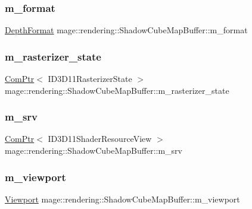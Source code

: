 \subsubsection{\texorpdfstring{m\+\_\+format}{m\_format}}
{\footnotesize\ttfamily \hyperlink{namespacemage_1_1rendering_ad477e1afff480649a92fb2253c65bfb0}{Depth\+Format} mage\+::rendering\+::\+Shadow\+Cube\+Map\+Buffer\+::m\+\_\+format\hspace{0.3cm}{\ttfamily [private]}}

\hypertarget{classmage_1_1rendering_1_1_shadow_cube_map_buffer_ab11e333f6832b5ec5710767badca29ef}{}\label{classmage_1_1rendering_1_1_shadow_cube_map_buffer_ab11e333f6832b5ec5710767badca29ef} 
\subsubsection{\texorpdfstring{m\+\_\+rasterizer\+\_\+state}{m\_rasterizer\_state}}
{\footnotesize\ttfamily \hyperlink{namespacemage_ae74f374780900893caa5555d1031fd79}{Com\+Ptr}$<$ I\+D3\+D11\+Rasterizer\+State $>$ mage\+::rendering\+::\+Shadow\+Cube\+Map\+Buffer\+::m\+\_\+rasterizer\+\_\+state\hspace{0.3cm}{\ttfamily [private]}}

\hypertarget{classmage_1_1rendering_1_1_shadow_cube_map_buffer_affc35790722dfa58640cc8a1962d9ec9}{}\label{classmage_1_1rendering_1_1_shadow_cube_map_buffer_affc35790722dfa58640cc8a1962d9ec9} 
\subsubsection{\texorpdfstring{m\+\_\+srv}{m\_srv}}
{\footnotesize\ttfamily \hyperlink{namespacemage_ae74f374780900893caa5555d1031fd79}{Com\+Ptr}$<$ I\+D3\+D11\+Shader\+Resource\+View $>$ mage\+::rendering\+::\+Shadow\+Cube\+Map\+Buffer\+::m\+\_\+srv\hspace{0.3cm}{\ttfamily [private]}}

\hypertarget{classmage_1_1rendering_1_1_shadow_cube_map_buffer_a43b1240a39ab1385832c20da6241c9cb}{}\label{classmage_1_1rendering_1_1_shadow_cube_map_buffer_a43b1240a39ab1385832c20da6241c9cb} 
\subsubsection{\texorpdfstring{m\+\_\+viewport}{m\_viewport}}
{\footnotesize\ttfamily \hyperlink{classmage_1_1rendering_1_1_viewport}{Viewport} mage\+::rendering\+::\+Shadow\+Cube\+Map\+Buffer\+::m\+\_\+viewport\hspace{0.3cm}{\ttfamily [private]}}

